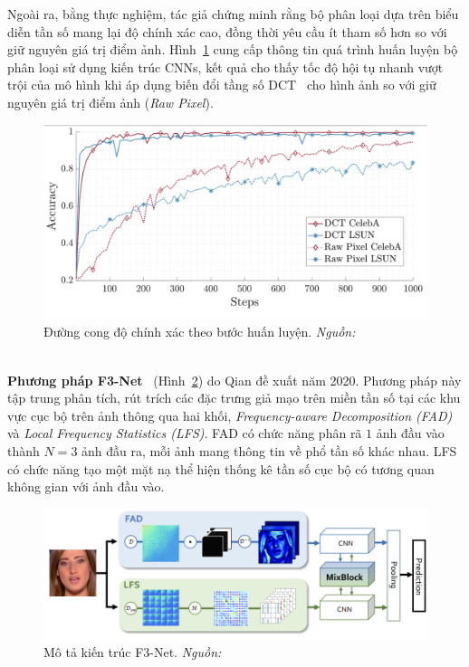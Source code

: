 Ngoài ra, bằng thực nghiệm, tác giả chứng minh rằng bộ phân loại dựa trên biểu diễn tần số mang lại độ chính xác cao, đồng thời yêu cầu ít tham số hơn so với giữ nguyên giá trị điểm ảnh. Hình~\ref{fig:frank-acc-comparison-1} cung cấp thông tin quá trình huấn luyện bộ phân loại sử dụng kiến trúc CNNs, kết quả cho thấy tốc độ hội tụ nhanh vượt trội của mô hình khi áp dụng biến đổi tầng số DCT~\cite{1672377} cho hình ảnh so với giữ nguyên giá trị điểm ảnh (\textit{Raw Pixel}).
%
\begin{figure}[ht!]
	\centering
	\includegraphics[width=1.0\linewidth]{Images/frank-acc-comparison-1.png}
	\begin{minipage}{0.9\linewidth}
		\caption{Đường cong độ chính xác theo bước huấn luyện. \textit{Nguồn: \cite{Frank2020LeveragingFA}}}
		\label{fig:frank-acc-comparison-1}
	\end{minipage}
\end{figure}\\
%
%
%
\textbf{Phương pháp F3-Net}~\cite{Qian2020ThinkingIF} (Hình~\ref{fig:model-f3-net-1}) do Qian đề xuất năm 2020.
Phương pháp này tập trung phân tích, rút trích các đặc trưng giả mạo trên miền tần số tại các khu vực cục bộ trên ảnh thông qua hai khối, \textit{Frequency-aware Decomposition (FAD)} và \textit{Local Frequency Statistics (LFS)}. FAD có chức năng phân rã $1$ ảnh đầu vào thành $N=3$ ảnh đầu ra, mỗi ảnh mang thông tin về phổ tần số khác nhau. LFS có chức năng tạo một mặt nạ thể hiện thống kê tần số cục bộ có tương quan không gian với ảnh đầu vào.
\begin{figure}[ht!]
	\centering
	\includegraphics[width=1.0\linewidth]{Images/model-f3-net-1.png}
	\begin{minipage}{0.9\linewidth}
		\caption{Mô tả kiến trúc F3-Net. \textit{Nguồn: \cite{Qian2020ThinkingIF}}}
		\label{fig:model-f3-net-1}
	\end{minipage}
\end{figure}\\
